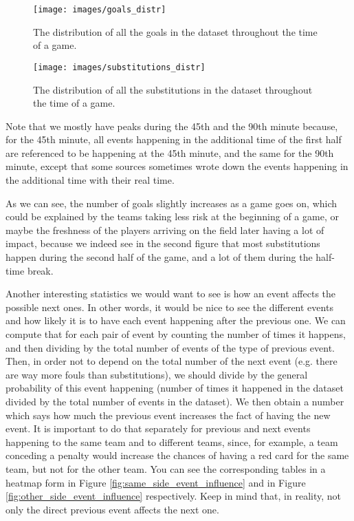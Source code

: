 \documentclass[10pt,conference,onecolumn]{IEEEtran}
\begin{document}
\begin{figure}[H]
\centering
\texttt{[image: images/goals\_distr]}
\caption{The distribution of all the goals in the dataset throughout the time of a game.}
\label{fig:goals_distr}
\end{figure}

\begin{figure}[H]
\centering
\texttt{[image: images/substitutions\_distr]}
\caption{The distribution of all the substitutions in the dataset throughout the time of a game.}
\label{fig:substitutions_distr}
\end{figure}

Note that we mostly have peaks during the 45th and the 90th minute because, for the 45th minute, all events happening in the additional time of the first half are referenced to be happening at the 45th minute, and the same for the 90th minute, except that some sources sometimes wrote down the events happening in the additional time with their real time.

As we can see, the number of goals slightly increases as a game goes on, which could be explained by the teams taking less risk at the beginning of a game, or maybe the freshness of the players arriving on the field later having a lot of impact, because we indeed see in the second figure that most substitutions happen during the second half of the game, and a lot of them during the half-time break.

Another interesting statistics we would want to see is how an event affects the possible next ones. In other words, it would be nice to see the different events and how likely it is to have each event happening after the previous one. We can compute that for each pair of event by counting the number of times it happens, and then dividing by the total number of events of the type of previous event. Then, in order not to depend on the total number of the next event (e.g. there are way more fouls than substitutions), we should divide by the general probability of this event happening (number of times it happened in the dataset divided by the total number of events in the dataset). We then obtain a number which says how much the previous event increases the fact of having the new event. It is important to do that separately for previous and next events happening to the same team and to different teams, since, for example, a team conceding a penalty would increase the chances of having a red card for the same team, but not for the other team. You can see the corresponding tables in a heatmap form in Figure \ref{fig:same_side_event_influence} and in Figure \ref{fig:other_side_event_influence} respectively. Keep in mind that, in reality, not only the direct previous event affects the next one.
\end{document}
